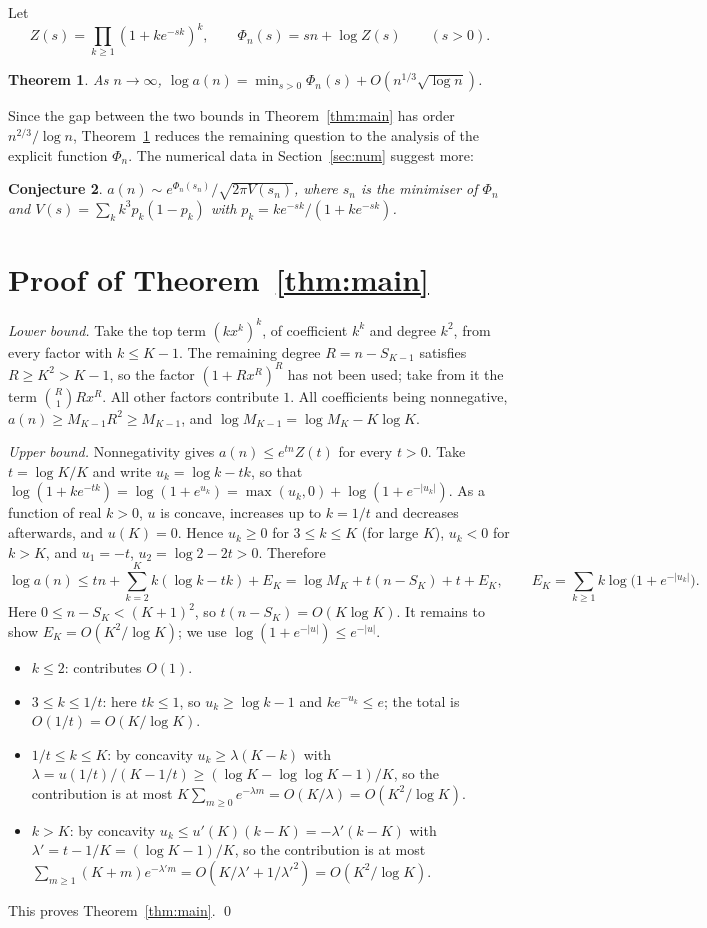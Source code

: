 \documentclass[11pt,a4paper]{article}
\newtheorem{theorem}{Theorem}
\newtheorem{conjecture}[theorem]{Conjecture}
\theoremstyle{remark}
\begin{document}
Let
\[
 Z(s)=\prod_{k\ge1}(1+ke^{-sk})^k,\qquad \Phi_n(s)=sn+\log Z(s)\qquad(s>0).
\]

\begin{theorem}\label{thm:saddle}
As $n\to\infty$, $\log a(n)=\min_{s>0}\Phi_n(s)+O(n^{1/3}\sqrt{\log n})$.
\end{theorem}

Since the gap between the two bounds in Theorem~\ref{thm:main} has order $n^{2/3}/\log n$, Theorem~\ref{thm:saddle} reduces the remaining question to the analysis of the explicit function $\Phi_n$. The numerical data in Section~\ref{sec:num} suggest more:

\begin{conjecture}\label{conj}
$a(n)\sim e^{\Phi_n(s_n)}/\sqrt{2\pi V(s_n)}$, where $s_n$ is the minimiser of $\Phi_n$ and $V(s)=\sum_k k^3p_k(1-p_k)$ with $p_k=ke^{-sk}/(1+ke^{-sk})$.
\end{conjecture}

\section{Proof of Theorem~\ref{thm:main}}

\emph{Lower bound.} Take the top term $(kx^k)^k$, of coefficient $k^k$ and degree $k^2$, from every factor with $k\le K-1$. The remaining degree $R=n-S_{K-1}$ satisfies $R\ge K^2>K-1$, so the factor $(1+Rx^R)^R$ has not been used; take from it the term $\binom R1Rx^R$. All other factors contribute $1$. All coefficients being nonnegative, $a(n)\ge M_{K-1}R^2\ge M_{K-1}$, and $\log M_{K-1}=\log M_K-K\log K$.

\emph{Upper bound.} Nonnegativity gives $a(n)\le e^{tn}Z(t)$ for every $t>0$. Take $t=\log K/K$ and write $u_k=\log k-tk$, so that $\log(1+ke^{-tk})=\log(1+e^{u_k})=\max(u_k,0)+\log(1+e^{-|u_k|})$. As a function of real $k>0$, $u$ is concave, increases up to $k=1/t$ and decreases afterwards, and $u(K)=0$. Hence $u_k\ge0$ for $3\le k\le K$ (for large $K$), $u_k<0$ for $k>K$, and $u_1=-t$, $u_2=\log2-2t>0$. Therefore
\[
 \log a(n)\le tn+\sum_{k=2}^Kk(\log k-tk)+E_K=\log M_K+t(n-S_K)+t+E_K,\qquad E_K=\sum_{k\ge1}k\log\bigl(1+e^{-|u_k|}\bigr).
\]
Here $0\le n-S_K<(K+1)^2$, so $t(n-S_K)=O(K\log K)$. It remains to show $E_K=O(K^2/\log K)$; we use $\log(1+e^{-|u|})\le e^{-|u|}$.
\begin{itemize}
\item $k\le2$: contributes $O(1)$.
\item $3\le k\le1/t$: here $tk\le1$, so $u_k\ge\log k-1$ and $ke^{-u_k}\le e$; the total is $O(1/t)=O(K/\log K)$.
\item $1/t\le k\le K$: by concavity $u_k\ge\lambda(K-k)$ with $\lambda=u(1/t)/(K-1/t)\ge(\log K-\log\log K-1)/K$, so the contribution is at most $K\sum_{m\ge0}e^{-\lambda m}=O(K/\lambda)=O(K^2/\log K)$.
\item $k>K$: by concavity $u_k\le u'(K)(k-K)=-\lambda'(k-K)$ with $\lambda'=t-1/K=(\log K-1)/K$, so the contribution is at most $\sum_{m\ge1}(K+m)e^{-\lambda'm}=O(K/\lambda'+1/\lambda'^2)=O(K^2/\log K)$.
\end{itemize}
This proves Theorem~\ref{thm:main}. \qed
\end{document}

